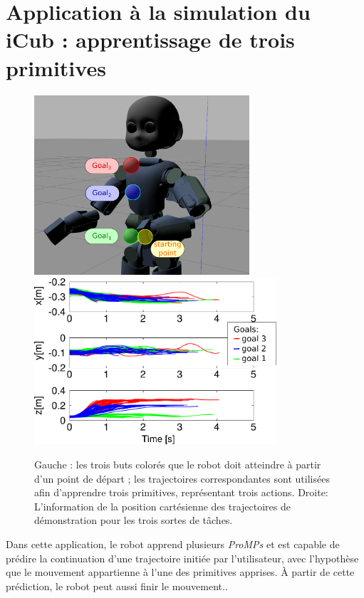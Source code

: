 \documentclass[utf8]{frontiersSCNS} %
\begin{document}
\section{Application à la simulation du iCub : apprentissage de trois primitives}
\label{sec:3ProMPsAppli}
\begin{figure}[h]
\centering
{\includegraphics[width=8cm]{img/gazeboGoalsV2.pdf}
\hspace{0.1cm}
\includegraphics[width=9cm]{img/3DOFtrajectories.pdf}
}
\caption{Gauche : les trois buts colorés que le robot doit atteindre à partir d'un point de départ ; les trajectoires correspondantes sont utilisées afin d'apprendre trois primitives, représentant trois actions. 
Droite: L'information de la position cartésienne des trajectoires de démonstration pour les trois sortes de tâches.}%
\label{fig:3TargetsTrajectories}
\label{fig:GazeboGoal}
\end{figure}

Dans cette application, le robot apprend plusieurs \textit{ProMPs} et est capable de prédire la continuation d'une trajectoire initiée par l'utilisateur, avec l'hypothèse que le mouvement appartienne à l'une des primitives apprises. À partir de cette prédiction, le robot peut aussi finir le mouvement.. 
\end{document}
